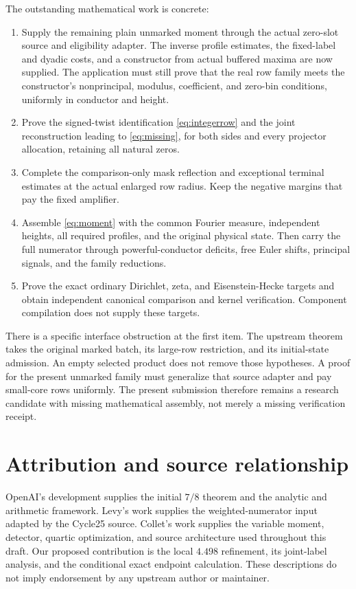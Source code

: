 \documentclass[11pt]{article}
\theoremstyle{definition}
\begin{document}
The outstanding mathematical work is concrete:
\begin{enumerate}
\item Supply the remaining plain unmarked moment through the actual
zero-slot source and eligibility adapter. The inverse profile estimates,
the fixed-label and dyadic costs, and a constructor from actual buffered
maxima are now supplied. The application must still prove that the real
row family meets the constructor's nonprincipal, modulus, coefficient,
and zero-bin conditions, uniformly in conductor and height.
\item Prove the signed-twist identification \eqref{eq:integerrow} and
the joint reconstruction leading to \eqref{eq:missing}, for both sides
and every projector allocation, retaining all natural zeros.
\item Complete the comparison-only mask reflection and exceptional
terminal estimates at the actual enlarged row radius. Keep the negative
margins that pay the fixed amplifier.
\item Assemble \eqref{eq:moment} with the common Fourier measure,
independent heights, all required profiles, and the original physical
state. Then carry the full numerator through powerful-conductor
deficits, free Euler shifts, principal signals, and the family reductions.
\item Prove the exact ordinary Dirichlet, zeta, and Eisenstein-Hecke
targets and obtain independent canonical comparison and kernel
verification. Component compilation does not supply these targets.
\end{enumerate}
There is a specific interface obstruction at the first item. The
upstream  theorem takes the original
marked batch, its large-row restriction, and its initial-state admission.
An empty selected product does not remove those hypotheses. A proof for
the present unmarked family must generalize that source adapter and pay
small-core rows uniformly. The present submission therefore remains a
research candidate with missing mathematical assembly, not merely a
missing verification receipt.

\section{Attribution and source relationship}\label{sec:credits}

OpenAI's development supplies the initial $7/8$ theorem and the analytic
and arithmetic framework. Levy's work supplies the weighted-numerator
input adapted by the Cycle25 source. Collet's work supplies the variable
moment, detector, quartic optimization, and source architecture used
throughout this draft. Our proposed contribution is the local
$4.498$ refinement, its joint-label analysis, and the conditional exact
endpoint calculation. These descriptions do not imply endorsement by
any upstream author or maintainer.
\end{document}
